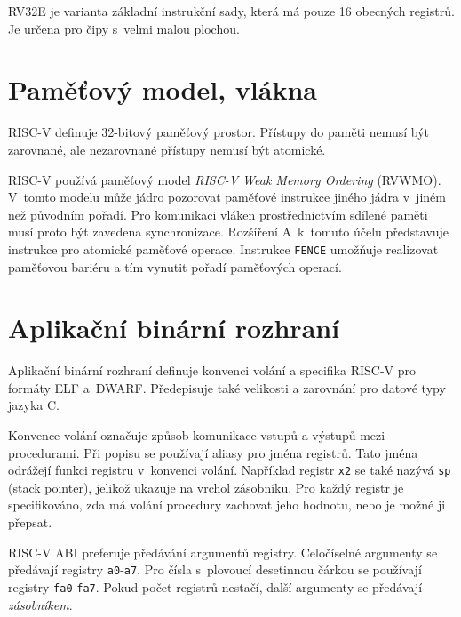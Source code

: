 
RV32E je varianta základní instrukční sady, která má pouze 16 obecných registrů.
Je určena pro čipy s~velmi malou plochou.

\section{Paměťový model, vlákna}

RISC-V definuje 32-bitový paměťový prostor.
Přístupy do paměti nemusí být zarovnané, ale nezarovnané přístupy nemusí být atomické.

RISC-V používá paměťový model \emph{RISC-V Weak Memory Ordering} (RVWMO).
V~tomto modelu může jádro pozorovat paměťové instrukce jiného jádra v~jiném než původním pořadí.
Pro komunikaci vláken prostřednictvím sdílené paměti musí proto být zavedena synchronizace.
Rozšíření A~k~tomuto účelu představuje instrukce pro atomické paměťové operace.
Instrukce \texttt{FENCE} umožňuje realizovat paměťovou bariéru a tím vynutit pořadí paměťových operací.


\section{Aplikační binární rozhraní}

Aplikační binární rozhraní definuje konvenci volání a specifika RISC-V pro formáty ELF a~DWARF.
Předepisuje také velikosti a zarovnání pro datové typy jazyka C.
\cite{riscvabi}

Konvence volání označuje způsob komunikace vstupů a výstupů mezi procedurami.
Při popisu se používají aliasy pro jména registrů.
Tato jména odrážejí funkci registru v~konvenci volání.
Například registr \texttt{x2} se také nazývá \texttt{sp} (stack pointer), jelikož ukazuje na vrchol zásobníku.
Pro každý registr je specifikováno, zda má volání procedury zachovat jeho hodnotu, nebo je možné ji přepsat.

RISC-V ABI preferuje předávání argumentů registry.
Celočíselné argumenty se předávají registry \texttt{a0}-\texttt{a7}.
Pro čísla s~plovoucí desetinnou čárkou se používají registry \texttt{fa0}-\texttt{fa7}.
Pokud počet registrů nestačí, další argumenty se předávají \emph{zásobníkem}.

